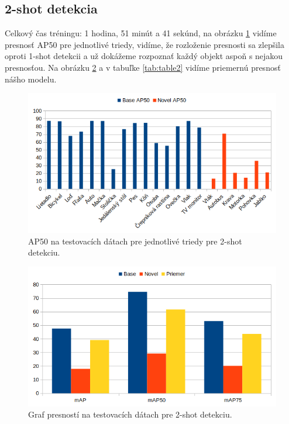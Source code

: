 \subsection{2-shot detekcia}

Celkový čas tréningu: 1 hodina, 51 minút a 41 sekúnd, na obrázku \ref{fig:image21} vidíme presnosť AP50 pre jednotlivé triedy, vidíme, že rozloženie presnosti sa zlepšila oproti 1-shot detekcii a už dokážeme rozpoznať každý objekt aspoň s nejakou presnosťou. Na obrázku \ref{fig:image23} a v tabuľke \ref{tab:table2} vidíme priemernú presnosť nášho modelu.

\begin{figure}[H]
\includegraphics[width=\textwidth]{images/2_shot_classes_AP50.png}
\centering
\caption{AP50 na testovacích dátach pre jednotlivé triedy pre 2-shot detekciu.}
\label{fig:image21}
\end{figure}

\begin{figure}[H]
\includegraphics[width=\textwidth]{images/2_shot_meanAP.png}
\centering
\caption{Graf presností na testovacích dátach pre 2-shot detekciu.}
\label{fig:image23}
\end{figure}

